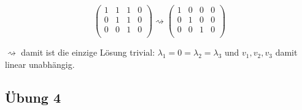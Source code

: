 \documentclass{article}
\begin{document}
\begin{enumerate}[(i)]
  \[
    \left(
    \begin{array}{ccc|c}
      1 & 1 & 1 & 0 \\
      0 & 1 & 1 & 0 \\
      0 & 0 & 1 & 0 \\
    \end{array}
    \right)
    \rightsquigarrow
    \left(
    \begin{array}{ccc|c}
      1 & 0 & 0 & 0 \\
      0 & 1 & 0 & 0 \\
      0 & 0 & 1 & 0 \\
    \end{array}
    \right)
  \]
  
  $\rightsquigarrow$ damit ist die einzige Lösung trivial: $\lambda_1 = 0 = \lambda_2 = \lambda_3$ und
  $v_1, v_2, v_3$ damit linear unabhängig.
  
\end{enumerate}

\subsection*{Übung 4}
\end{document}
